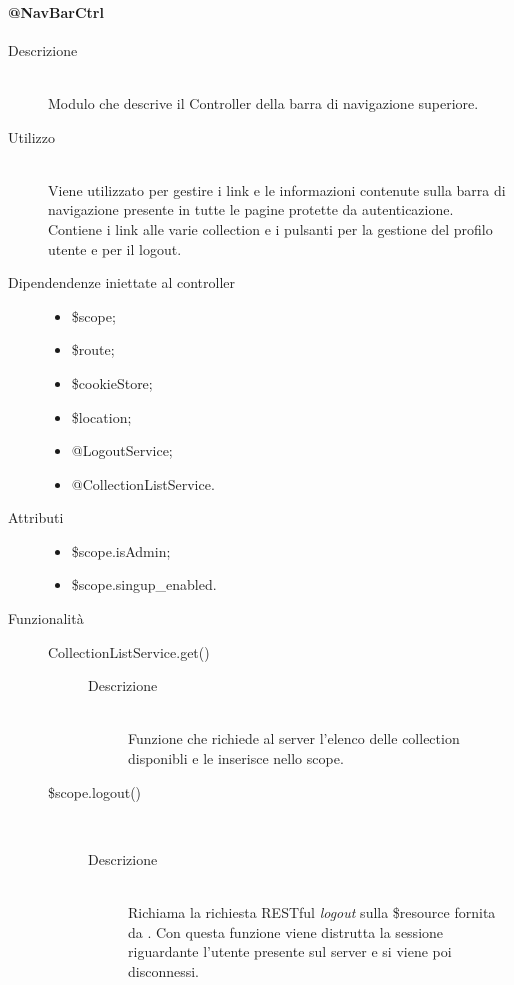 \paragraph{@NavBarCtrl}
\begin{description}
 \item[Descrizione] \hfill \\
 Modulo che descrive il Controller della barra di navigazione superiore.
 
 \item[Utilizzo] \hfill \\
 Viene utilizzato per gestire i link e le informazioni contenute sulla barra di navigazione presente in tutte le pagine protette da autenticazione.
 Contiene i link alle varie collection e i pulsanti per la gestione del profilo utente e per il logout.
 
 \item[Dipendendenze iniettate al controller] \hfill 
 \begin{itemize}
  \item \$scope;
  \item \$route;
  \item \$cookieStore;
  \item \$location;
  \item @LogoutService;
  \item @CollectionListService.
  
 \end{itemize}
 
 \item[Attributi] \hfill 
 \begin{itemize}
 \item \$scope.isAdmin;
 \item \$scope.singup\_enabled.

 \end{itemize}
 
 \item[Funzionalità] \hfill 
 \begin{description}
    \item[CollectionListService.get()] \hfill
    \begin{description}
  		\item[Descrizione] \hfill \\
    Funzione che richiede al server l'elenco delle collection disponibli e le inserisce nello scope.
  \end{description}
  
  	\item[\$scope.logout()] \hfill \\
  	\begin{description}
  	\item[Descrizione] \hfill \\
  Richiama la richiesta RESTful \textit{logout} sulla \$resource fornita da . Con questa funzione viene distrutta la sessione riguardante l'utente presente sul server e si viene poi disconnessi.
  	\end{description}
 \end{description}
\end{description}

